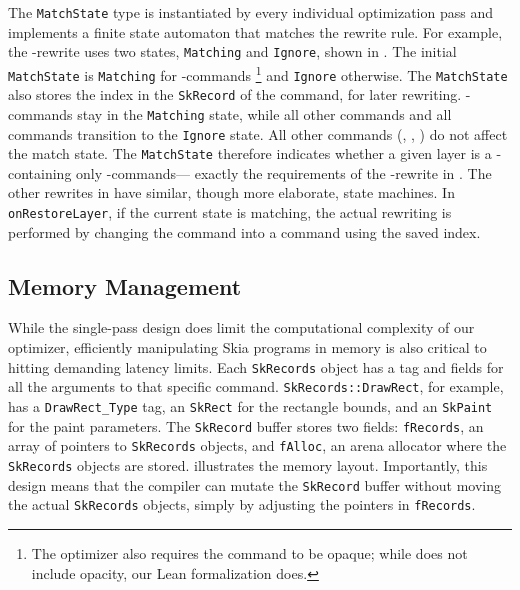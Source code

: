 \documentclass[main.tex]{subfiles}
\begin{document}
The \texttt{MatchState} type is instantiated by
  every individual optimization pass
  and implements a finite state automaton
  that matches the rewrite rule.
For example, the \SrcOver-\SaveLayer rewrite
  uses two states, \texttt{Matching} and \texttt{Ignore},
  shown in .
The initial \texttt{MatchState} is \texttt{Matching}
  for \SrcOver-\SaveLayer commands%
\footnote{
The optimizer also requires
  the \SaveLayer command to be opaque;
  while  does not include opacity,
  our Lean formalization does.
}
  and \texttt{Ignore} otherwise.
The \texttt{MatchState} also stores
  the index in the \texttt{SkRecord}
  of the \SaveLayer command,
  for later rewriting.
\SrcOver-\Draw commands stay in the \texttt{Matching} state,
  while all other \Draw commands and all \SaveLayer commands
  transition to the \texttt{Ignore} state.
All other commands (\Clip, \Save, \Restore)
  do not affect the match state.
The \texttt{MatchState} therefore indicates
  whether a given layer
  is a \SrcOver-\SaveLayer containing only
  \SrcOver-\Draw commands---%
  exactly the requirements of the \SrcOver-\SaveLayer rewrite
  in .
The other rewrites in  have
  similar, though more elaborate, state machines.
In \texttt{onRestoreLayer},
  if the current state is matching,
  the actual rewriting is performed
  by changing the \SaveLayer command
  into a \Save command
  using the saved index.

\subsection{Memory Management}

While the single-pass design does limit
  the computational complexity of our optimizer,
  efficiently manipulating Skia programs in memory
  is also critical to hitting demanding latency limits.
Each \texttt{SkRecords} object
  has a tag and fields for all the arguments
  to that specific command.
\texttt{SkRecords::DrawRect}, for example,
  has a \texttt{DrawRect\_Type} tag,
  an \texttt{SkRect} for the rectangle bounds,
  and an \texttt{SkPaint} for the paint parameters.
The \texttt{SkRecord} buffer stores two fields:
  \texttt{fRecords},
  an array of pointers to \texttt{SkRecords} objects,
  and \texttt{fAlloc}, an arena allocator
  where the \texttt{SkRecords} objects are stored.
  illustrates the memory layout.
Importantly, this design means that
  the compiler can mutate the \texttt{SkRecord} buffer
  without moving the actual \texttt{SkRecords} objects,
  simply by adjusting the pointers in \texttt{fRecords}.
\end{document}
